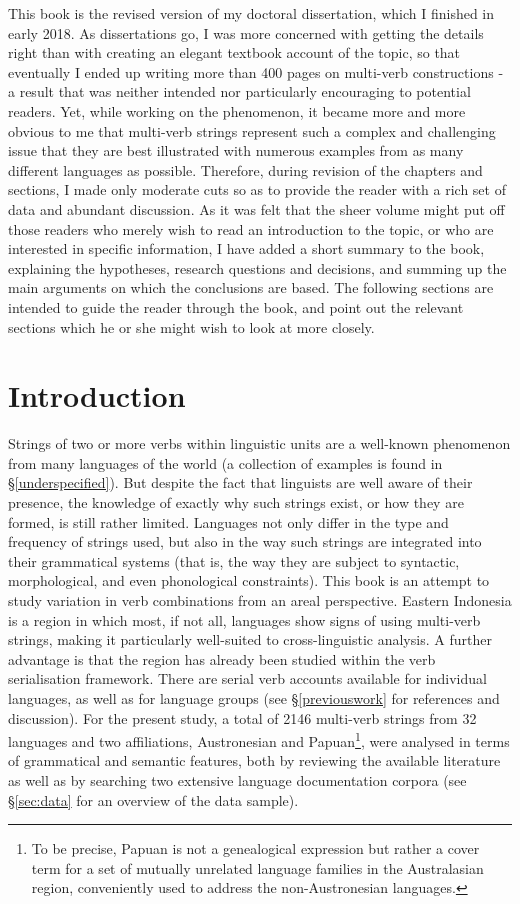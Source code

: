 
This book is the revised version of my doctoral dissertation, which I finished in early 2018. As dissertations go, I was more concerned with getting the details right than with creating an elegant textbook account of the topic, so that eventually I ended up writing more than 400 pages on multi-verb constructions - a result that was neither intended nor particularly encouraging to potential readers. Yet, while working on the phenomenon, it became more and more obvious to me that multi-verb strings represent such a complex and challenging issue that they are best illustrated with numerous examples from as many different languages as possible. Therefore, during revision of the chapters and sections, I made only moderate cuts so as to provide the reader with a rich set of data and abundant discussion. As it was felt that the sheer volume might put off those readers who merely wish to read an introduction to the topic, or who are interested in specific information, I have added a short summary to the book, explaining the hypotheses, research questions and decisions, and summing up the main arguments on which the conclusions are based. The following sections are intended to guide the reader through the book, and point out the relevant sections which he or she might wish to look at more closely. 

\section*{Introduction}

Strings of two or more verbs within linguistic units are a well-known phenomenon from many languages of the world (a collection of examples is found in §\ref{underspecified}). But despite the fact that linguists are well aware of their presence, the knowledge of exactly why such strings exist, or how they are formed, is still rather limited. Languages not only differ in the type and frequency of strings used, but also in the way such strings are integrated into their grammatical systems (that is, the way they are subject to syntactic, morphological, and even phonological constraints). This book is an attempt to study variation in verb combinations from an areal perspective. Eastern Indonesia is a region in which most, if not all, languages show signs of using multi-verb strings, making it particularly well-suited to cross-linguistic analysis. A further advantage is that the region has already been studied within the verb serialisation framework. There are serial verb accounts available for individual languages, as well as for language groups (see §\ref{previouswork} for references and discussion). For the present study, a total of 2146 multi-verb strings from 32 languages and two affiliations, Austronesian and Papuan\footnote{To be precise, Papuan is not a genealogical expression but rather a cover term for a set of mutually unrelated language families in the Australasian region, conveniently used to address the non-Austronesian languages.}, were analysed in terms of grammatical and semantic features, both by reviewing the available literature as well as by searching two extensive language documentation corpora (see §\ref{sec:data} for an overview of the data sample).

